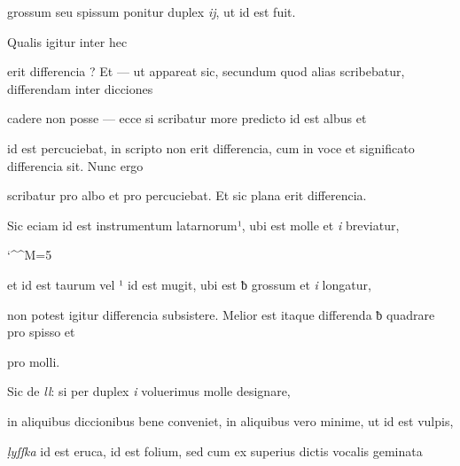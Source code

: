 \splitlines

grossum seu spissum ponitur duplex \textit{ij}, ut  id est fuit.

Qualis igitur inter hec

\fulllines
erit differencia ? Et — ut appareat sic, secundum quod alias scribebatur, differendam inter dicciones

cadere non posse — ecce si scribatur more predicto  id est albus et 

id est percuciebat, in scripto non erit differencia, cum in voce et significato differencia sit. Nunc ergo

scribatur  pro albo et  pro percuciebat. Et sic plana erit differencia.

Sic eciam  id est instrumentum latarnorum¹, ubi est   molle et \textit{i} breviatur,


\catcode `\^^M=5


\obeylines

et  id est taurum vel ¹ id est mugit, ubi est ƀ grossum et \textit{i} longatur,

non potest igitur differencia subsistere. Melior est itaque differenda ƀ quadrare pro spisso et 

\splitlines
{} pro molli.

\indentK Sic de \textit{ll}: si per duplex \textit{i} voluerimus  molle designare,

\fulllines
in aliquibus diccionibus bene conveniet, in aliquibus vero minime, ut  id est vulpis,

\textit{ḷyſſka} id est eruca,  id est folium, sed cum ex superius dictis vocalis geminata

